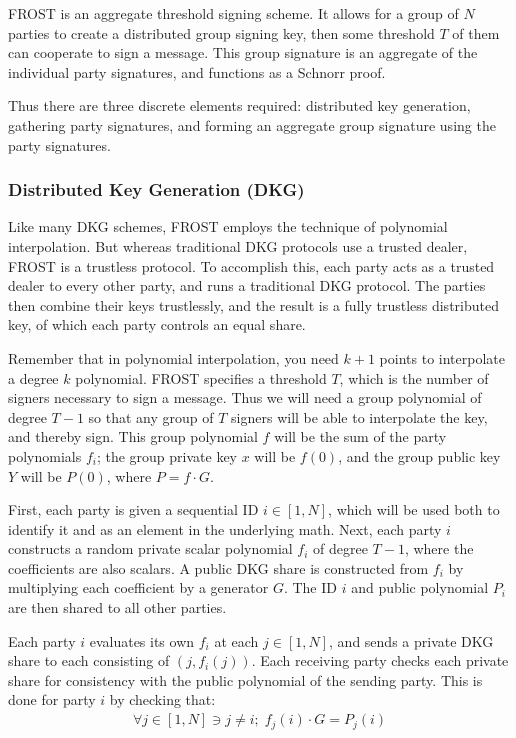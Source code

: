 \documentclass{article}
\begin{document}
FROST is an aggregate threshold signing scheme.  It allows for a group of $N$ parties to create a distributed group signing key, then some threshold $T$ of them can cooperate to sign a message.  This group signature is an aggregate of the individual party signatures, and functions as a Schnorr proof.

Thus there are three discrete elements required: distributed key generation, gathering party signatures, and forming an aggregate group signature using the party signatures.

\subsubsection{
  Distributed Key Generation (DKG)
}

Like many DKG schemes, FROST employs the technique of polynomial interpolation.  But whereas traditional DKG protocols use a trusted dealer, FROST is a trustless protocol.  To accomplish this, each party acts as a trusted dealer to every other party, and runs a traditional DKG protocol.  The parties then combine their keys trustlessly, and the result is a fully trustless distributed key, of which each party controls an equal share.

Remember that in polynomial interpolation, you need $k+1$ points to interpolate a degree $k$ polynomial.  FROST specifies a threshold $T$, which is the number of signers necessary to sign a message.  Thus we will need a group polynomial of degree $T-1$ so that any group of $T$ signers will be able to interpolate the key, and thereby sign.  This group polynomial $f$ will be the sum of the party polynomials $f_i$; the group private key $x$ will be $f(0)$, and the group public key $Y$ will be $P(0)$, where $P = f \cdot G$.

First, each party is given a sequential ID $i \in [1, N]$, which will be used both to identify it and as an element in the underlying math.  Next, each party $i$ constructs a random private scalar polynomial $f_i$ of degree $T-1$, where the coefficients are also scalars.  A public DKG share is constructed from $f_i$ by multiplying each coefficient by a generator $G$.  The ID $i$ and public polynomial $P_i$ are then shared to all other parties.

Each party $i$ evaluates its own $f_i$ at each $j \in [1,N]$, and sends a private DKG share to each consisting of $(j, f_i(j))$.  Each receiving party checks each private share for consistency with the public polynomial of the sending party.  This is done for party $i$ by checking that:
\begin{align}
  \forall j \in [1,N] \ni j \neq i;\;f_j(i) \cdot G = P_j(i)
\end{align}
\end{document}
